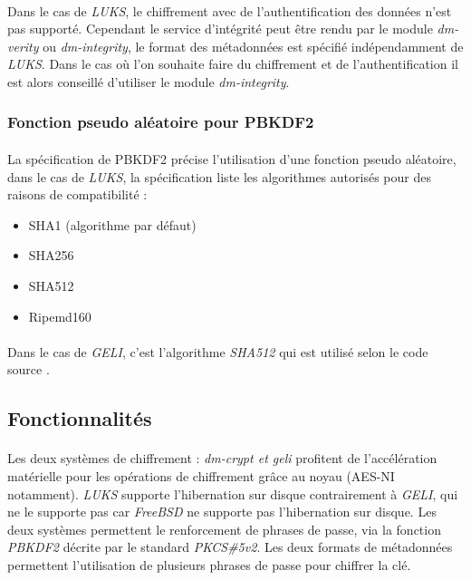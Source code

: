\paragraph{}
Dans le cas de {\em LUKS}, le chiffrement avec de l'authentification des 
données n'est pas supporté. Cependant le service d'intégrité peut être rendu 
par le module {\em dm-verity} ou {\em dm-integrity}, le format des métadonnées 
est spécifié indépendamment de {\em LUKS}. Dans le cas où l'on souhaite faire 
du chiffrement et de l'authentification il est alors conseillé d'utiliser le 
module {\em dm-integrity}.

\subsubsection{Fonction pseudo aléatoire pour PBKDF2}
\paragraph{}
La spécification de PBKDF2 \cite{PKCS5v2} précise l'utilisation d'une fonction
pseudo aléatoire, dans le cas de {\em LUKS}, la spécification 
\cite{onDiskFormatLuks} liste les algorithmes autorisés
pour des raisons de compatibilité :
\begin{itemize}
	\item SHA1 (algorithme par défaut)
	\item SHA256
	\item SHA512
	\item Ripemd160
\end{itemize}
\paragraph{}
Dans le cas de {\em GELI}, c'est l'algorithme {\em SHA512} qui est utilisé
selon le code source \cite{geliPkcs5v2.c}.
\subsection{Fonctionnalités}
\paragraph{}
Les deux systèmes de chiffrement : {\em dm-crypt \em et \em geli} profitent 
de l'accélération matérielle pour les opérations de chiffrement grâce au 
noyau (AES-NI notamment). {\em LUKS} supporte l'hibernation sur disque 
contrairement à {\em GELI}, qui ne le supporte pas car {\em FreeBSD} ne 
supporte pas l'hibernation sur disque. Les deux systèmes permettent le 
renforcement de phrases de passe, via la fonction {\em PBKDF2} décrite 
par le standard {\em PKCS\#5v2}. Les deux formats de métadonnées 
permettent l'utilisation de plusieurs phrases de passe pour chiffrer la clé.

